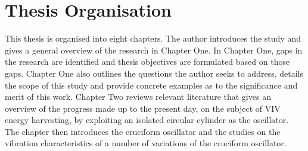 \documentclass[oneside]{utmthesis}
\begin{document}

\section{Thesis Organisation} \label{sec:thesisOrg}

\vspace{\baselineskip}

This thesis is organised into eight chapters. The author introduces the study and gives a general overview of the research in Chapter One. In Chapter One, gaps in the research are identified and thesis objectives are formulated based on those gaps. Chapter One also outlines the questions the author seeks to address, details the scope of this study and provide concrete examples as to the significance and merit of this work. Chapter Two reviews relevant literature that gives an overview of the progress made up to the present day, on the subject of VIV energy harvesting, by exploiting an isolated circular cylinder as the oscillator. The chapter then introduces the cruciform oscillator and the studies on the vibration characteristics of a number of variations of the cruciform oscillator.
\end{document}
